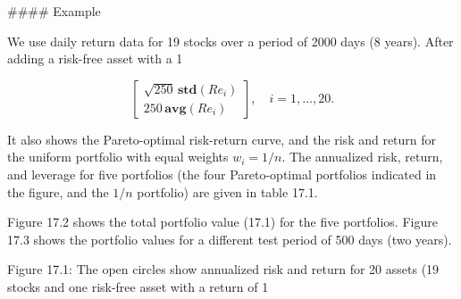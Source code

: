 

#### Example

We use daily return data for 19 stocks over a period of 2000 days (8 years). After adding a risk-free asset with a 1%

\[\left[\begin{array}{c}\sqrt{250}\,\mathbf{std}(Re_{i})\\ 250\,\mathbf{avg}(Re_{i})\end{array}\right],\quad i=1,\ldots,20.\]

It also shows the Pareto-optimal risk-return curve, and the risk and return for the uniform portfolio with equal weights \(w_{i}=1/n\). The annualized risk, return, and leverage for five portfolios (the four Pareto-optimal portfolios indicated in the figure, and the \(1/n\) portfolio) are given in table 17.1.

Figure 17.2 shows the total portfolio value (17.1) for the five portfolios. Figure 17.3 shows the portfolio values for a different test period of 500 days (two years).

Figure 17.1: The open circles show annualized risk and return for 20 assets (19 stocks and one risk-free asset with a return of 1%

